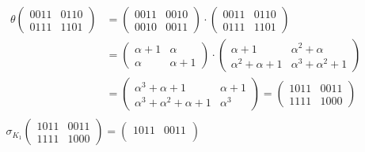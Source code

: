 \documentclass[fleqn]{article}
\begin{document}
\begin{equation*}
\begin{aligned}
            &\begin{aligned} 
                \theta 
                \begin{pmatrix}
                    0011 & 0110 \\
                    0111 & 1101
                \end{pmatrix} &=
                \begin{pmatrix}
                    0011 & 0010 \\
                    0010 & 0011
                \end{pmatrix} \cdot
                \begin{pmatrix}
                    0011 & 0110 \\
                    0111 & 1101
                \end{pmatrix} \\ &= 
                 \begin{pmatrix}
                    \alpha + 1 & \alpha \\
                    \alpha & \alpha + 1
                 \end{pmatrix} \cdot
                    \begin{pmatrix} 
                        \alpha + 1 & \alpha^2 + \alpha \\
                        \alpha^2 + \alpha + 1 & \alpha^3 + \alpha^2 + 1
                    \end{pmatrix} \\ &=
                    \begin{pmatrix}
                        \alpha^3 + \alpha + 1 & \alpha + 1 \\
                        \alpha^3 + \alpha^2 + \alpha + 1 & \alpha^3
                    \end{pmatrix} = 
                    \begin{pmatrix}
                        1011 & 0011 \\
                        1111 & 1000
                    \end{pmatrix}
            \end{aligned} \\
            &\sigma_{K_1} \begin{pmatrix}
                1011 & 0011 \\
                1111 & 1000
            \end{pmatrix} =
            \begin{pmatrix}
                1011 & 0011 \\

\end{pmatrix}
\end{aligned}
\end{equation*}
\end{document}
